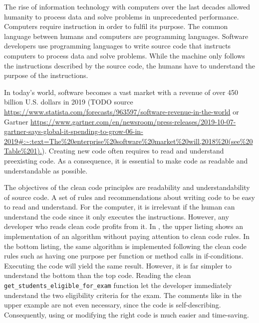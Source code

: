 The rise of information technology with computers over the last decades allowed humanity to process data and solve problems in unprecedented performance. Computers require instruction in order to fulfil its purpose. The common language between humans and computers are programming languages. Software developers use programming languages to write source code that instructs computers to process data and solve problems. While the machine only follows the instructions described by the source code, the humans have to understand the purpose of the instructions. 

In today's world, software becomes a vast market with a revenue of over 450 billion U.S. dollars in 2019 (TODO source \url{https://www.statista.com/forecasts/963597/software-revenue-in-the-world} or Gartner \url{https://www.gartner.com/en/newsroom/press-releases/2019-10-07-gartner-says-global-it-spending-to-grow-06-in-2019#:~:text=The%20enterprise%20software%20market%20will,2018%20(see%20Table%201).}). Creating new code often requires to read and understand preexisting code. As a consequence, it is essential to make code as readable and understandable as possible. 

The objectives of the clean code principles are readability and understandability of source code. A set of rules and recommendations about writing code to be easy to read and understand. For the computer, it is irrelevant if the human can understand the code since it only executes the instructions. However, any developer who reads clean code profits from it. In , the upper listing shows an implementation of an algorithm without paying attention to clean code rules. In the bottom listing, the same algorithm is implemented following the clean code rules such as having one purpose per function or method calls in if-conditions. Executing the code will yield the same result. However, it is far simpler to understand the bottom than the top code. Reading the clean \texttt{get\_students\_eligible\_for\_exam} function let the developer immediately understand the two eligibility criteria for the exam. The comments like in the upper example are not even necessary, since the code is self-describing.
Consequently, using or modifying the right code is much easier and time-saving.

